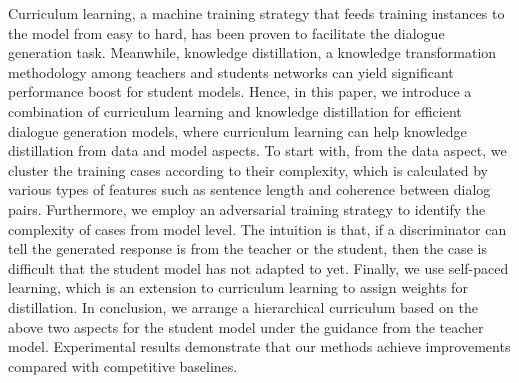 Curriculum learning, a machine training strategy that feeds training instances to the model from easy to hard, has been proven to facilitate the dialogue generation task. Meanwhile, knowledge distillation, a knowledge transformation methodology among teachers and students networks can yield significant performance boost for student models. Hence, in this paper, we introduce a combination of curriculum learning and knowledge distillation for efficient dialogue generation models, where curriculum learning can help knowledge distillation from data and model aspects. To start with, from the data aspect, we cluster the training cases according to their complexity, which is calculated by various types of features such as sentence length and coherence between dialog pairs. Furthermore, we employ an adversarial training strategy to identify the complexity of cases from model level.  The intuition is that, if a discriminator can tell the generated response is from the teacher or the student, then the case is difficult that the student model has not adapted to yet. Finally, we use self-paced learning, which is an extension to curriculum learning to assign weights for distillation. In conclusion, we arrange a hierarchical curriculum based on the above two aspects for the student model under the guidance from the teacher model. Experimental results demonstrate that our methods achieve improvements compared with competitive baselines.
